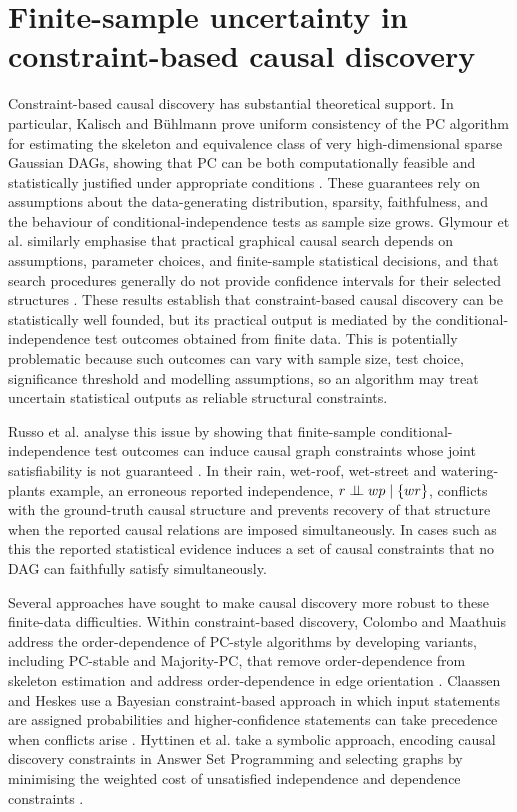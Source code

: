 \section{Finite-sample uncertainty in constraint-based causal discovery}
Constraint-based causal discovery has substantial theoretical support. In particular, Kalisch and B{\"u}hlmann prove uniform consistency of the PC algorithm for estimating the skeleton and equivalence class of very high-dimensional sparse Gaussian DAGs, showing that PC can be both computationally feasible and statistically justified under appropriate conditions \cite{kalisch2007estimating}. These guarantees rely on assumptions about the data-generating distribution, sparsity, faithfulness, and the behaviour of conditional-independence tests as sample size grows. Glymour et al. similarly emphasise that practical graphical causal search depends on assumptions, parameter choices, and finite-sample statistical decisions, and that search procedures generally do not provide confidence intervals for their selected structures \cite{glymour2019review}. These results establish that constraint-based causal discovery can be statistically well founded, but its practical output is mediated by the conditional-independence test outcomes obtained from finite data. This is potentially problematic because such outcomes can vary with sample size, test choice, significance threshold and modelling assumptions, so an algorithm may treat uncertain statistical outputs as reliable structural constraints. 

Russo et al. analyse this issue by showing that finite-sample conditional-independence test outcomes can induce causal graph constraints whose joint satisfiability is not guaranteed \cite{russo2024argumentative}. In their rain, wet-roof, wet-street and watering-plants example, an erroneous reported independence, \(r \mathrel{\perp\!\!\!\perp} wp \mid \{wr\}\), conflicts with the ground-truth causal structure and prevents recovery of that structure when the reported causal relations are imposed simultaneously. In cases such as this the reported statistical evidence induces a set of causal constraints that no DAG can faithfully satisfy simultaneously.

Several approaches have sought to make causal discovery more robust to these finite-data difficulties. Within constraint-based discovery, Colombo and Maathuis address the order-dependence of PC-style algorithms by developing variants, including PC-stable and Majority-PC, that remove order-dependence from skeleton estimation and address order-dependence in edge orientation \cite{colombo2014order}. Claassen and Heskes use a Bayesian constraint-based approach in which input statements are assigned probabilities and higher-confidence statements can take precedence when conflicts arise \cite{claassen2012bayesian}. Hyttinen et al. take a symbolic approach, encoding causal discovery constraints in Answer Set Programming \cite{gel88} and selecting graphs by minimising the weighted cost of unsatisfied independence and dependence constraints \cite{hyttinen2014constraint}.

